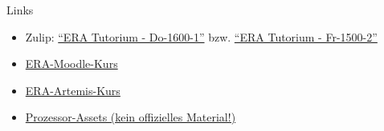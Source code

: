 \documentclass[
  german,            %
  aspectratio=169,    %
]{tumbeamer}
\begin{document}
\begin{frame}[c, fragile]{Links}{}
	\begin{itemize}
		\item Zulip: \href{https://zulip.in.tum.de/#narrow/stream/2661-ERA-Tutorium---Do-1600-1}{\enquote{ERA Tutorium - Do-1600-1}}
		      bzw. \href{https://zulip.in.tum.de/#narrow/stream/2675-ERA-Tutorium---Fr-1500-2 }{\enquote{ERA Tutorium - Fr-1500-2}}
		\item \href{https://www.moodle.tum.de/course/view.php?id=100633}{ERA-Moodle-Kurs}
		\item \href{https://artemis.in.tum.de/courses/401}{ERA-Artemis-Kurs}
		\item \href{https://courses.edx.org/assets/courseware/v1/f06a2dc0c856f60ec0711e9f5e1c98cf/asset-v1:HarveyMuddX+ENGR85B+1T2023+type@asset+block/FinalReferences.pdf}{Prozessor-Assets (kein offizielles Material!)}
	\end{itemize}
\end{frame}

\maketitle
\end{document}
